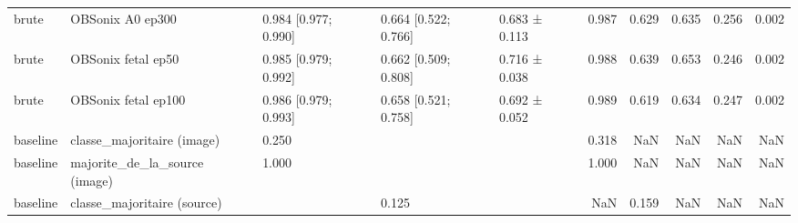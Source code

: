 \begin{tabular}{lllllrrrrr}
brute & OBSonix A0 ep300 & 0.984 [0.977; 0.990] & 0.664 [0.522; 0.766] & 0.683 ± 0.113 & 0.987 & 0.629 & 0.635 & 0.256 & 0.002 \\
brute & OBSonix fetal ep50 & 0.985 [0.979; 0.992] & 0.662 [0.509; 0.808] & 0.716 ± 0.038 & 0.988 & 0.639 & 0.653 & 0.246 & 0.002 \\
brute & OBSonix fetal ep100 & 0.986 [0.979; 0.993] & 0.658 [0.521; 0.758] & 0.692 ± 0.052 & 0.989 & 0.619 & 0.634 & 0.247 & 0.002 \\
baseline & classe_majoritaire (image) & 0.250 &  &  & 0.318 & NaN & NaN & NaN & NaN \\
baseline & majorite_de_la_source (image) & 1.000 &  &  & 1.000 & NaN & NaN & NaN & NaN \\
baseline & classe_majoritaire (source) &  & 0.125 &  & NaN & 0.159 & NaN & NaN & NaN \\
\bottomrule
\end{tabular}
